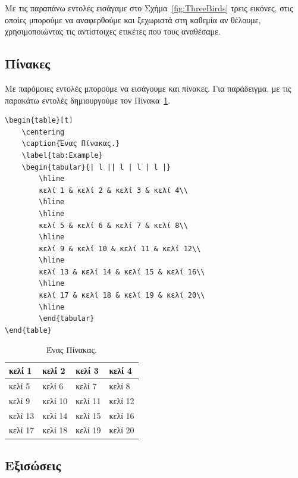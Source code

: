 Με τις παραπάνω εντολές εισάγαμε στο Σχήμα~\ref{fig:ThreeBirds} τρεις εικόνες, στις οποίες μπορούμε να αναφερθούμε και ξεχωριστά στη καθεμία αν θέλουμε, χρησιμοποιώντας τις αντίστοιχες ετικέτες που τους αναθέσαμε.


\subsection{Πίνακες}
\label{subsec:Tables}

Με παρόμοιες εντολές μπορούμε να εισάγουμε και πίνακες.
Για παράδειγμα, με τις παρακάτω εντολές δημιουργούμε τον Πίνακα~\ref{tab:Example}.

\begin{verbatim}
\begin{table}[t]
    \centering
    \caption{Ένας Πίνακας.}
    \label{tab:Example}
    \begin{tabular}{| l || l | l | l |}
        \hline
        κελί 1 & κελί 2 & κελί 3 & κελί 4\\
        \hline
        \hline
        κελί 5 & κελί 6 & κελί 7 & κελί 8\\
        \hline
        κελί 9 & κελί 10 & κελί 11 & κελί 12\\
        \hline
        κελί 13 & κελί 14 & κελί 15 & κελί 16\\
        \hline
        κελί 17 & κελί 18 & κελί 19 & κελί 20\\
        \hline
        \end{tabular}
\end{table}
\end{verbatim}

\begin{table}[t]
	\centering
	\caption{Ένας Πίνακας.}
	\label{tab:Example}
	\begin{tabular}{| l || l | l | l |}
		\hline
		κελί 1 & κελί 2 & κελί 3 & κελί 4\\
		\hline
		\hline
		κελί 5 & κελί 6 & κελί 7 & κελί 8\\
		\hline
		κελί 9 & κελί 10 & κελί 11 & κελί 12\\
		\hline
		κελί 13 & κελί 14 & κελί 15 & κελί 16\\
		\hline
		κελί 17 & κελί 18 & κελί 19 & κελί 20\\
		\hline
	\end{tabular}
\end{table}


\subsection{Εξισώσεις}
\label{subsec:Equations}

